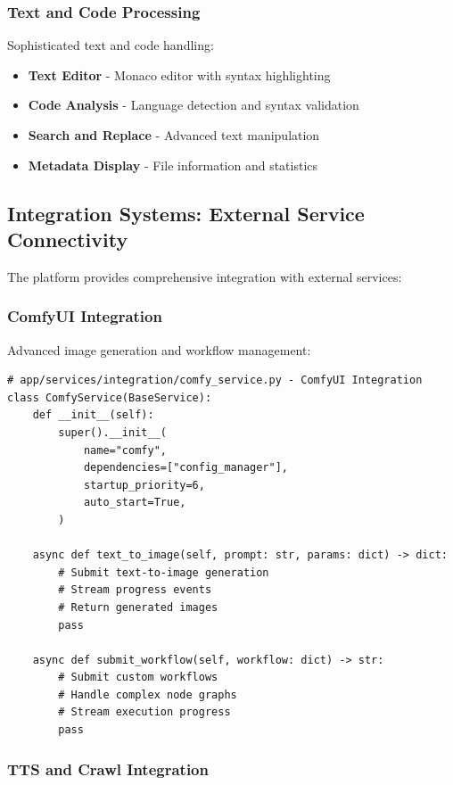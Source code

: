 \documentclass[11pt]{article}
\begin{document}
\subsubsection{Text and Code Processing}

Sophisticated text and code handling:

\begin{itemize}
\item \textbf{Text Editor} - Monaco editor with syntax highlighting
\item \textbf{Code Analysis} - Language detection and syntax validation
\item \textbf{Search and Replace} - Advanced text manipulation
\item \textbf{Metadata Display} - File information and statistics
\end{itemize}

\subsection{Integration Systems: External Service Connectivity}

The platform provides comprehensive integration with external services:

\subsubsection{ComfyUI Integration}

Advanced image generation and workflow management:

\begin{lstlisting}[style=python]
# app/services/integration/comfy_service.py - ComfyUI Integration
class ComfyService(BaseService):
    def __init__(self):
        super().__init__(
            name="comfy",
            dependencies=["config_manager"],
            startup_priority=6,
            auto_start=True,
        )
    
    async def text_to_image(self, prompt: str, params: dict) -> dict:
        # Submit text-to-image generation
        # Stream progress events
        # Return generated images
        pass
    
    async def submit_workflow(self, workflow: dict) -> str:
        # Submit custom workflows
        # Handle complex node graphs
        # Stream execution progress
        pass
\end{lstlisting}

\subsubsection{TTS and Crawl Integration}
\end{document}
